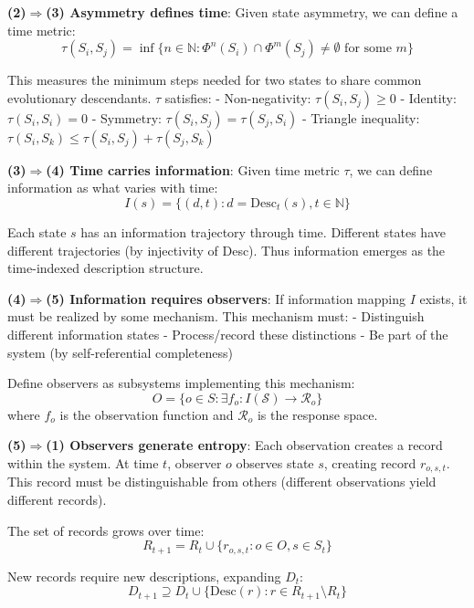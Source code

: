 \textbf{(2)$\Rightarrow$(3) Asymmetry defines time}:
Given state asymmetry, we can define a time metric:
\begin{equation}
\tau(S_i, S_j) = \inf\{n \in \mathbb{N}: \Phi^n(S_i) \cap \Phi^m(S_j) \neq \emptyset \text{ for some } m\}
\end{equation}

This measures the minimum steps needed for two states to share common evolutionary descendants.
$\tau$ satisfies:
- Non-negativity: $\tau(S_i, S_j) \geq 0$
- Identity: $\tau(S_i, S_i) = 0$  
- Symmetry: $\tau(S_i, S_j) = \tau(S_j, S_i)$
- Triangle inequality: $\tau(S_i, S_k) \leq \tau(S_i, S_j) + \tau(S_j, S_k)$

\textbf{(3)$\Rightarrow$(4) Time carries information}:
Given time metric $\tau$, we can define information as what varies with time:
\begin{equation}
I(s) = \{(d, t): d = \text{Desc}_t(s), t \in \mathbb{N}\}
\end{equation}

Each state $s$ has an information trajectory through time.
Different states have different trajectories (by injectivity of Desc).
Thus information emerges as the time-indexed description structure.

\textbf{(4)$\Rightarrow$(5) Information requires observers}:
If information mapping $I$ exists, it must be realized by some mechanism.
This mechanism must:
- Distinguish different information states
- Process/record these distinctions
- Be part of the system (by self-referential completeness)

Define observers as subsystems implementing this mechanism:
\begin{equation}
O = \{o \in S: \exists f_o: I(\mathcal{S}) \to \mathcal{R}_o\}
\end{equation}
where $f_o$ is the observation function and $\mathcal{R}_o$ is the response space.

\textbf{(5)$\Rightarrow$(1) Observers generate entropy}:
Each observation creates a record within the system.
At time $t$, observer $o$ observes state $s$, creating record $r_{o,s,t}$.
This record must be distinguishable from others (different observations yield different records).

The set of records grows over time:
\begin{equation}
R_{t+1} = R_t \cup \{r_{o,s,t}: o \in O, s \in S_t\}
\end{equation}

New records require new descriptions, expanding $D_t$:
\begin{equation}
D_{t+1} \supseteq D_t \cup \{\text{Desc}(r): r \in R_{t+1} \setminus R_t\}
\end{equation}

